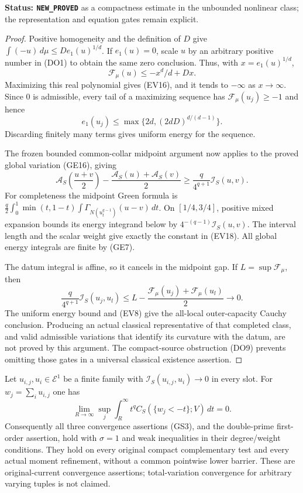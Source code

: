 \noindent\textbf{Status: \texttt{NEW\_PROVED}} as a
compactness estimate in the unbounded nonlinear class;
the representation and equation gates remain explicit.

\begin{proof}
Positive homogeneity and the definition of $D$ give
$\int(-u)\,d\mu\leq D e_1(u)^{1/d}$.
If $e_1(u)=0$, scale $u$ by an arbitrary positive number
in (DO1) to obtain the same zero conclusion.
Thus, with $x=e_1(u)^{1/d}$,
\[
                \mathcal F_\mu(u)\leq-x^d/d+Dx.
\]
Maximizing this real polynomial gives (EV16), and it tends
to $-\infty$ as $x\to\infty$. Since $0$ is admissible,
every tail of a maximizing sequence has
$\mathcal F_\mu(u_j)\geq-1$ and hence
\[
          e_1(u_j)\leq
             \max\{2d,(2dD)^{d/(d-1)}\}.
 \tag{EV17}
\]
Discarding finitely many terms gives uniform energy for
the sequence.

The frozen bounded common-collar midpoint argument now
applies to the proved global variation (GE16), giving
\[
 \mathscr A_S\left(\frac{u+v}2\right)
       -\frac{\mathscr A_S(u)+\mathscr A_S(v)}2
            \geq\frac q{4^{q+1}}\mathscr I_S(u,v).
 \tag{EV18}
\]
For completeness the midpoint Green formula is
$\frac q2\int_0^1\min(t,1-t)
 \int\Gamma_{N(u_t^{q-1})}(u-v)\,dt$.
On $[1/4,3/4]$, positive mixed expansion bounds its
energy integrand below by $4^{-(q-1)}\mathscr I_S(u,v)$.
The interval length and the scalar weight give exactly
the constant in (EV18). All global energy integrals
are finite by (GE7).

The datum integral is affine, so it cancels in the midpoint
gap. If $L=\sup\mathcal F_\mu$, then
\[
 \frac q{4^{q+1}}\mathscr I_S(u_j,u_l)
        \leq L-\frac{\mathcal F_\mu(u_j)+
                              \mathcal F_\mu(u_l)}2\longrightarrow0.
\]
The uniform energy bound and (EV8) give the all-local
outer-capacity Cauchy conclusion. Producing an actual
classical representative of that completed class, and
valid admissible variations that identify its curvature
with the datum, are not proved by this argument. The
compact-source obstruction (DO9) prevents omitting those
gates in a universal classical existence assertion.
\end{proof}

\begin{corollary}
\label{cor:r11-strong-first-energy-graded-endpoints}
Let $u_{i,j},u_i\in\mathcal E^1$ be a finite family with
$\mathscr I_S(u_{i,j},u_i)\to0$ in every slot. For
$w_j=\sum_i u_{i,j}$ one has
\[
 \lim_{R\to\infty}\sup_j\int_R^\infty
                 t^q C_S(\{w_j<-t\};V)\,dt=0.
 \tag{EV19}
\]
Consequently all three convergence assertions (GS3), and
the double-prime first-order assertion, hold with
$\sigma=1$ and weak inequalities in their degree/weight
conditions. They hold on every original compact
complementary test and every actual moment refinement,
without a common pointwise lower barrier. These are
original-current convergence assertions; total-variation
convergence for arbitrary varying tuples is not claimed.
\end{corollary}

